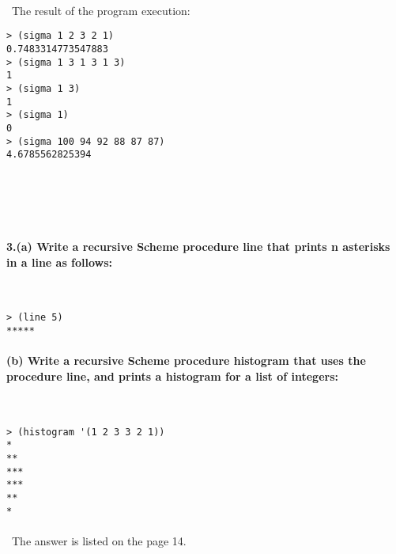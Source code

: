 \documentclass{article}
\begin{document}
\paragraph{}\	
\paragraph{}\
	The result of the program execution:
	
\begin{verbatim} 
> (sigma 1 2 3 2 1)
0.7483314773547883
> (sigma 1 3 1 3 1 3)
1
> (sigma 1 3)
1
> (sigma 1)
0
> (sigma 100 94 92 88 87 87)
4.6785562825394
\end{verbatim}
	
\paragraph{}\
\paragraph{}\

\paragraph{3.\quad (a) Write a recursive Scheme procedure line that prints n asterisks in a line as follows:}\

\begin{verbatim} 
> (line 5)
*****
\end{verbatim}

\paragraph{\qquad (b) Write a recursive Scheme procedure histogram that uses the procedure line, and prints a histogram for a list of integers:}\

\begin{verbatim} 
> (histogram '(1 2 3 3 2 1))
*
**
***
***
**
*
\end{verbatim}
\paragraph{}\
		The answer is listed on the page 14.

\paragraph{}\
\paragraph{}\
\end{document}
